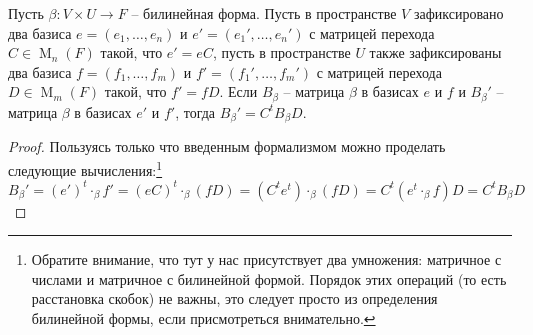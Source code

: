 \begin{claim}
Пусть $\beta\colon V\times U\to F$ -- билинейная форма. Пусть в пространстве $V$ зафиксировано два базиса $e=(e_1,\ldots,e_n)$ и $e' = (e_1',\ldots,e_n')$ с матрицей перехода $C\in \operatorname{M}_n(F)$ такой, что $e'=eC$, пусть в пространстве $U$ также зафиксированы два базиса $f = (f_1,\ldots,f_m)$ и $f'=(f_1',\ldots,f_m')$ с матрицей перехода $D\in \operatorname{M}_m(F)$ такой, что $f' = fD$. Если $B_\beta$ -- матрица $\beta$ в базисах $e$ и $f$ и $B_\beta'$ -- матрица $\beta$ в базисах $e'$ и $f'$, тогда $B_\beta' = C^t B_\beta D$.
\end{claim}
\begin{proof}
Пользуясь только что введенным формализмом можно проделать следующие вычисления:\footnote{Обратите внимание, что тут у нас присутствует два умножения: матричное с числами и матричное с билинейной формой. Порядок этих операций (то есть расстановка скобок) не важны, это следует просто из определения билинейной формы, если присмотреться внимательно.}
\[
B_\beta' = (e')^t\cdot_\beta f' = (eC)^t \cdot_\beta (f D) = (C^t e^t) \cdot_\beta (f D) = C^t(e^t \cdot_\beta f) D = C^t B_\beta D
\]
\end{proof}


